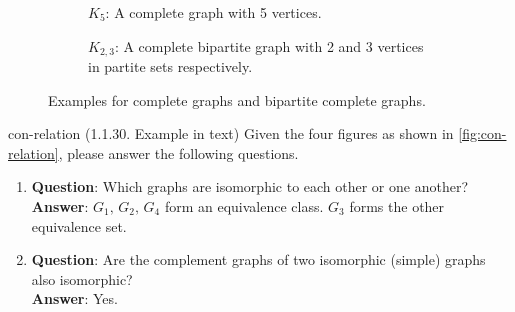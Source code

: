 \documentclass[../src/handouts/main.tex]{subfiles}
\begin{document}
\begin{figure}[htbp]
  \centering
  \begin{subfigure}[t]{.4\textwidth}
    \centering
    \caption{$K_5$: A complete graph with 5 vertices.}
    \label{fig:con-complete}
  \end{subfigure}
  \hspace{2cm}
  \begin{subfigure}[t]{.4\textwidth}
    \centering
    \caption{$K_{2,3}$: A complete bipartite graph with 2 and 3 vertices in partite sets respectively.}
    \label{fig:con-complete-bipartite}
  \end{subfigure}
  \caption{Examples for complete graphs and bipartite complete graphs.}
  \label{fig:con-complete-bipartite-full}
\end{figure}

\begin{example}{}{con-relation}
  (1.1.30. Example in text)
  Given the four figures as shown in \cref{fig:con-relation}, please answer the following questions.
  \begin{enumerate}
    \item \textbf{Question}: Which graphs are isomorphic to each other or one another?\\\textbf{Answer}: $G_1,\, G_2,\, G_4$ form an equivalence class. $G_3$ forms the other equivalence set.

    \item \textbf{Question}: Are the complement graphs of two isomorphic (simple) graphs also isomorphic?\\\textbf{Answer}: Yes.
  \end{enumerate}
\end{example}
\end{document}
